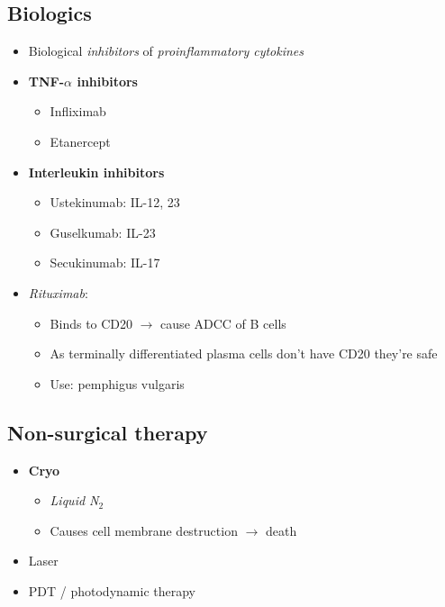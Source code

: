\documentclass[
  12pt,
]{memoir}
\providecommand{\tightlist}{%
  \setlength{\itemsep}{0pt}\setlength{\parskip}{0pt}}
\begin{document}
\hypertarget{biologics}{%
\subsection{Biologics}\label{biologics}}

\begin{itemize}
\tightlist
\item
  Biological \emph{inhibitors} of \emph{proinflammatory cytokines}
\item
  \textbf{TNF-\(\alpha\) inhibitors}

  \begin{itemize}
  \tightlist
  \item
    Infliximab
  \item
    Etanercept
  \end{itemize}
\item
  \textbf{Interleukin inhibitors}

  \begin{itemize}
  \tightlist
  \item
    Ustekinumab: IL-12, 23
  \item
    Guselkumab: IL-23
  \item
    Secukinumab: IL-17
  \end{itemize}
\item
  \emph{Rituximab}:

  \begin{itemize}
  \tightlist
  \item
    Binds to CD20 \(\rightarrow\) cause ADCC of B cells
  \item
    As terminally differentiated plasma cells don't have CD20 they're
    safe
  \item
    Use: pemphigus vulgaris
  \end{itemize}
\end{itemize}

\hypertarget{non-surgical-therapy}{%
\subsection{Non-surgical therapy}\label{non-surgical-therapy}}

\begin{itemize}
\tightlist
\item
  \textbf{Cryo}

  \begin{itemize}
  \tightlist
  \item
    \emph{Liquid N\(_2\)}
  \item
    Causes cell membrane destruction \(\rightarrow\) death
  \end{itemize}
\item
  Laser
\item
  PDT / photodynamic therapy
\end{itemize}
\end{document}
